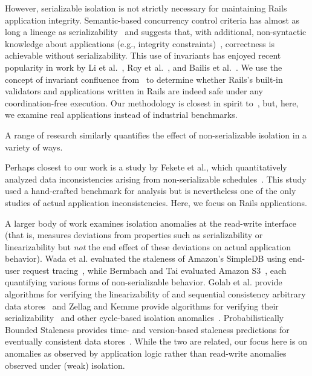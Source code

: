 However, serializable isolation is not strictly necessary for
maintaining Rails application integrity. Semantic-based concurrency
control criteria has almost as long a lineage as
serializability~\cite{eswaran-consistency,ic-survey-two} and suggests
that, with additional, non-syntactic knowledge about applications
(e.g., integrity constraints)~\cite{kung1979optimality}, correctness
is achievable without serializability. This use of invariants has
enjoyed recent popularity in work by Li et al.~\cite{redblue-new}, Roy
et al.~\cite{writes-forest}, and Bailis et al.~\cite{coord-avoid}. We
use the concept of invariant confluence from~\cite{coord-avoid} to
determine whether Rails's built-in validators and applications written
in Rails are indeed safe under any coordination-free execution. Our
methodology is closest in spirit to~\cite{coord-avoid}, but, here, we
examine real applications instead of industrial benchmarks.

 A range of research similarly
quantifies the effect of non-serializable isolation in a variety of
ways.

Perhaps closest to our work is a study by Fekete et al., which
quantitatively analyzed data inconsistencies arising from
non-serializable schedules~\cite{fekete-quantifying}. This study used
a hand-crafted benchmark for analysis but is nevertheless one of the only
studies of actual application inconsistencies. Here, we focus on Rails
applications.

A larger body of work examines isolation anomalies at the read-write
interface (that is, measures deviations from properties such as
serializability or linearizability but \textit{not} the end effect of
these deviations on actual application behavior). Wada et
al. evaluated the staleness of Amazon's SimpleDB using end-user
request tracing~\cite{wada-data}, while Bermbach and Tai evaluated
Amazon S3~\cite{bermbach-eventual}, each quantifying various forms of
non-serializable behavior. Golab et al. provide algorithms for
verifying the linearizability of and sequential consistency arbitrary
data stores~\cite{golab-analyzing} and Zellag and Kemme provide
algorithms for verifying their
serializability~\cite{zellag-consistent} and other cycle-based
isolation anomalies~\cite{zellag-real}. Probabilistically Bounded
Staleness provides time- and version-based staleness predictions for
eventually consistent data stores~\cite{pbs}. While the two are
related, our focus here is on anomalies as observed by application
logic rather than read-write anomalies observed under (weak) isolation.

